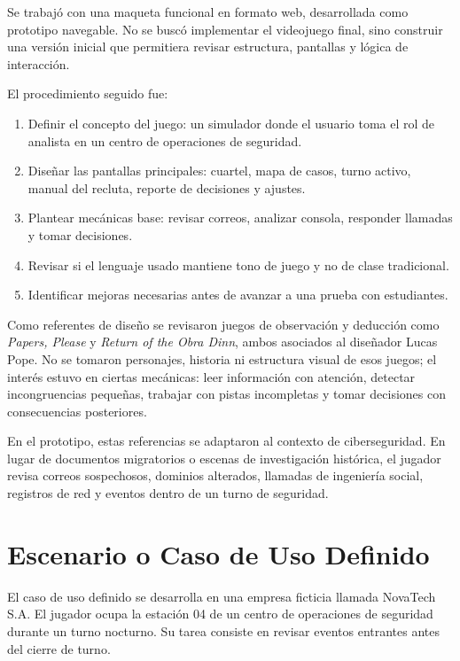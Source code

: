 \documentclass[12pt]{article}
\begin{document}
Se trabajó con una maqueta funcional en formato web, desarrollada como prototipo navegable. No se buscó implementar el videojuego final, sino construir una versión inicial que permitiera revisar estructura, pantallas y lógica de interacción.

El procedimiento seguido fue:

\begin{enumerate}
    \item Definir el concepto del juego: un simulador donde el usuario toma el rol de analista en un centro de operaciones de seguridad.
    \item Diseñar las pantallas principales: cuartel, mapa de casos, turno activo, manual del recluta, reporte de decisiones y ajustes.
    \item Plantear mecánicas base: revisar correos, analizar consola, responder llamadas y tomar decisiones.
    \item Revisar si el lenguaje usado mantiene tono de juego y no de clase tradicional.
    \item Identificar mejoras necesarias antes de avanzar a una prueba con estudiantes.
\end{enumerate}

Como referentes de diseño se revisaron juegos de observación y deducción como \textit{Papers, Please} y \textit{Return of the Obra Dinn}, ambos asociados al diseñador Lucas Pope. No se tomaron personajes, historia ni estructura visual de esos juegos; el interés estuvo en ciertas mecánicas: leer información con atención, detectar incongruencias pequeñas, trabajar con pistas incompletas y tomar decisiones con consecuencias posteriores.

En el prototipo, estas referencias se adaptaron al contexto de ciberseguridad. En lugar de documentos migratorios o escenas de investigación histórica, el jugador revisa correos sospechosos, dominios alterados, llamadas de ingeniería social, registros de red y eventos dentro de un turno de seguridad.

\section{Escenario o Caso de Uso Definido}

El caso de uso definido se desarrolla en una empresa ficticia llamada NovaTech S.A. El jugador ocupa la estación 04 de un centro de operaciones de seguridad durante un turno nocturno. Su tarea consiste en revisar eventos entrantes antes del cierre de turno.
\end{document}
